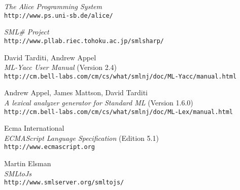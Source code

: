 \documentclass[twoside,titlepage]{article}
\begin{document}
\begin{appendix}
\begin{thebibliography}{MTHM97}
{\it The Alice Programming System} \\
{\small\tt{http://www.ps.uni-sb.de/alice/}}

{\it SML\# Project} \\
{\small\tt{http://www.pllab.riec.tohoku.ac.jp/smlsharp/}}

David Tarditi, Andrew Appel \\
{\it ML-Yacc User Manual} (Version 2.4) \\
{\small\tt{http://cm.bell-labs.com/cm/cs/what/smlnj/doc/ML-Yacc/manual.html}}

Andrew Appel, James Mattson, David Tarditi \\
{\it A lexical analyzer generator for Standard ML} (Version 1.6.0) \\
{\small\tt{http://cm.bell-labs.com/cm/cs/what/smlnj/doc/ML-Lex/manual.html}}

Ecma International \\
{\it ECMAScript Language Specification} (Edition 5.1) \\
{\small\tt{http://www.ecmascript.org}}

Martin Elsman \\
{\it SMLtoJs} \\
{\small\tt{http://www.smlserver.org/smltojs/}}

\end{thebibliography}


\end{appendix}

\end{document}
